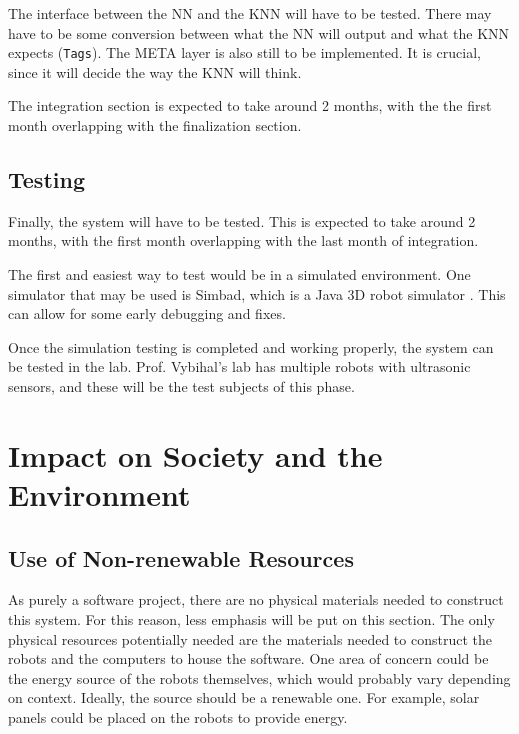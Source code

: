 \documentclass[titlepage,11pt]{article}
\newcommand{\code}[1]{\texttt{#1}}
\begin{document}
The interface between the NN and the KNN will have to be tested. There may have to be some conversion between what the NN will output and what the KNN expects (\code{Tags}). The META layer is also still to be implemented. It is crucial, since it will decide the way the KNN will think.

The integration section is expected to take around 2 months, with the the first month overlapping with the finalization section.

\subsection{Testing}

Finally, the system will have to be tested. This is expected to take around 2 months, with the first month overlapping with the last month of integration.

The first and easiest way to test would be in a simulated environment. One simulator that may be used is Simbad, which is a Java 3D robot simulator \cite{simbad}. This can allow for some early debugging and fixes.

Once the simulation testing is completed and working properly, the system can be tested in the lab. Prof. Vybihal's lab has multiple robots with ultrasonic sensors, and these will be the test subjects of this phase.

\section{Impact on Society and the Environment}


\subsection{Use of Non-renewable Resources}

As purely a software project, there are no physical materials needed to construct this system. For this reason, less emphasis will be put on this section. The only physical resources potentially needed are the materials needed to construct the robots and the computers to house the software. One area of concern could be the energy source of the robots themselves, which would probably vary depending on context. Ideally, the source should be a renewable one. For example, solar panels could be placed on the robots to provide energy.
\end{document}
